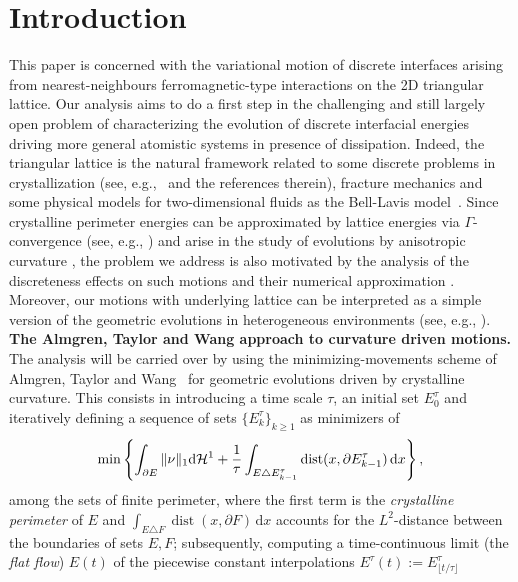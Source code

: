 \documentclass{interact}
\numberwithin{equation}{section}
\theoremstyle{definition}
\renewcommand{\H}{\mathcal{H}}
\DeclareMathOperator{\dist}{dist}
\begin{document}
\section{Introduction}
This paper is concerned with the variational motion of discrete interfaces arising from nearest-neighbours ferromagnetic-type interactions on the 2D triangular lattice. Our analysis aims to do a first step in the challenging and still largely open problem of characterizing the evolution of discrete interfacial energies driving more general atomistic systems in presence of dissipation. Indeed, the triangular lattice is the natural framework related to some discrete problems in crystallization (see, e.g.,~\cite{AYFS} and the references therein), fracture mechanics \cite{BG,BS2} and some physical models for two-dimensional fluids as the Bell-Lavis model~\cite{Bell1,Bell2}. Since crystalline perimeter energies can be approximated by lattice energies via $\Gamma$-convergence (see, e.g., \cite{ABC}) and arise in the study of evolutions by anisotropic curvature \cite{ATW83, CC, TCH1, TCH2, Ta0, Ta, Ta2}, the problem we address is also motivated by the analysis of the discreteness effects on such motions and their numerical approximation \cite{Chamb, ChambNov}. Moreover, our motions with underlying lattice can be interpreted as a simple version of the geometric evolutions in heterogeneous environments (see, e.g., \cite{Bat, Dirr}).\\ 
\noindent
{\bf The Almgren, Taylor and Wang approach to curvature driven motions.} The analysis will be carried over by using the minimizing-movements scheme of Almgren, Taylor and Wang~\cite{ATW83} for geometric evolutions driven by crystalline curvature. This consists in introducing a time scale $\tau$, an initial set $E_0^\tau$ and iteratively defining
a sequence of sets $\{E^\tau_k\}_{k\geq1}$ as minimizers of  
\begin{equation}
\min \left\{\int_{\partial E}\|\nu\|_1\mathrm{d}\H^1+{1\over \tau} \int_{E\triangle E^\tau_{k-1}}\dist(x,\partial E^\tau_{k-1})\,\mathrm{d}x\right\} ,
\label{ATW}
\end{equation}
among the sets of finite perimeter, where the first term is the \emph{crystalline perimeter} of $E$ %
and $\int_{E\triangle F}\dist(x,\partial F)\,\mathrm{d}x$ accounts for the $L^2$-distance between the boundaries of sets $E,F$; subsequently, computing a time-continuous limit (the \emph{flat flow}) $E(t)$ of the piecewise constant interpolations $E^\tau(t):=E^\tau_{\lfloor t/\tau\rfloor}$ %
\end{document}
